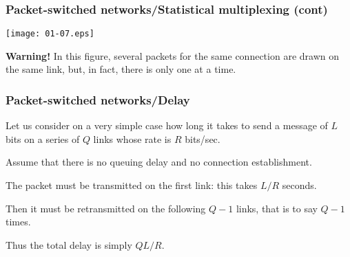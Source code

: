 %
\begin{frame}
\frametitle{Packet-switched networks/Statistical multiplexing (cont)}

\begin{center}
  \texttt{[image: 01-07.eps]}
\end{center}

\textbf{Warning!} In this figure, several packets for the same
connection are drawn on the same link, but, in fact, there is only one
at a time.

\end{frame}

%
\begin{frame}
\frametitle{Packet-switched networks/Delay}

Let us consider on a very simple case how long it takes to send a
message of \(L\) bits on a series of \(Q\) links whose rate is \(R\)
bits/sec. 

\bigskip

Assume that there is no queuing delay and no connection establishment.

\bigskip

The packet must be transmitted on the first link: this takes \(L/R\)
seconds.

\bigskip

Then it must be retransmitted on the following \(Q-1\) links, that is
to say \(Q-1\) times.

\bigskip

Thus the total delay is simply \(QL/R\).

\end{frame}

